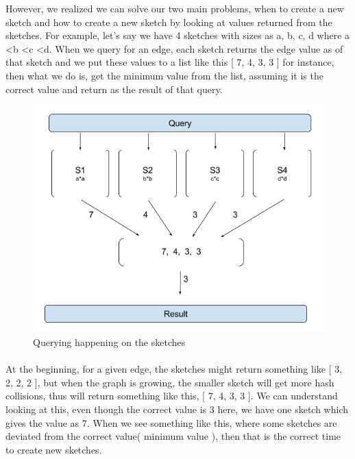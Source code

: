 \documentclass[12pt]{report}
\numberwithin{figure}{section}
\numberwithin{table}{section}
\begin{document}
However, we realized we can solve our two main problems, when to create a new sketch and how to create a new sketch by looking at values returned from the sketches. For example, let's say we have 4 sketches with sizes as a, b, c, d where a \textless  b \textless c \textless d. When we query for an edge, each sketch returns the edge value as of that sketch and  we put these values to a list like this [ 7, 4, 3, 3 ] for instance, then what we do is, get the minimum value from the list, assuming it is the correct value and return as the result of that query.

\begin{figure}[H]
\centering
\includegraphics[scale=0.7]{images/QueryOnSketches}
\caption{Querying happening on the sketches}
\end{figure}

\paragraph{}

At the beginning, for a given edge, the sketches might return something like [ 3, 2, 2, 2 ], but when the graph is growing, the smaller sketch will get more hash collisions, thus will return something like this, [ 7, 4, 3, 3  ]. We can understand looking at this, even though the correct value is 3 here, we have one sketch which gives the value as 7. When we see something like this, where some sketches are deviated from the correct value( minimum value ), then that is the correct time to create new sketches. 

\paragraph{}
\end{document}
